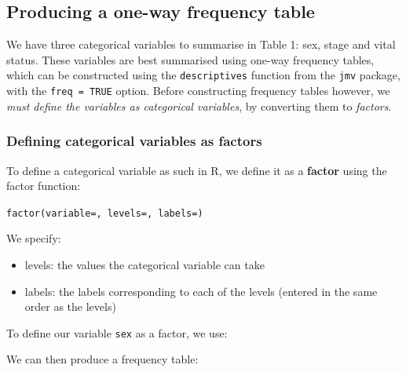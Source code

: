 \documentclass[
  a4paper,
]{memoir}
\newenvironment{Shaded}{\begin{snugshade}}{\end{snugshade}}
\newcommand{\AttributeTok}[1]{\textcolor[rgb]{0.00,0.00,0.00}{#1}}
\newcommand{\DecValTok}[1]{\textcolor[rgb]{0.00,0.00,0.00}{#1}}
\newcommand{\FunctionTok}[1]{\textcolor[rgb]{0.00,0.00,0.00}{#1}}
\newcommand{\NormalTok}[1]{\textcolor[rgb]{0.00,0.00,0.00}{#1}}
\newcommand{\OtherTok}[1]{\textcolor[rgb]{0.00,0.00,0.00}{#1}}
\newcommand{\SpecialCharTok}[1]{\textcolor[rgb]{0.00,0.00,0.00}{#1}}
\newcommand{\StringTok}[1]{\textcolor[rgb]{0.00,0.00,0.00}{#1}}
\providecommand{\tightlist}{%
  \setlength{\itemsep}{0pt}\setlength{\parskip}{0pt}}\usepackage{longtable,booktabs,array}
\begin{document}
\hypertarget{producing-a-one-way-frequency-table-1}{%
\subsection{Producing a one-way frequency
table}\label{producing-a-one-way-frequency-table-1}}

We have three categorical variables to summarise in Table 1: sex, stage
and vital status. These variables are best summarised using one-way
frequency tables, which can be constructed using the
\texttt{descriptives} function from the \texttt{jmv} package, with the
\texttt{freq\ =\ TRUE} option. Before constructing frequency tables
however, we \emph{must define the variables as categorical variables},
by converting them to \emph{factors}.

\hypertarget{sec-cat-as-factors}{%
\subsubsection{Defining categorical variables as
factors}\label{sec-cat-as-factors}}

To define a categorical variable as such in R, we define it as a
\textbf{factor} using the factor function:

\texttt{factor(variable=,\ levels=,\ labels=)}

We specify:

\begin{itemize}
\tightlist
\item
  levels: the values the categorical variable can take
\item
  labels: the labels corresponding to each of the levels (entered in the
  same order as the levels)
\end{itemize}

To define our variable \texttt{sex} as a factor, we use:

\begin{Shaded}
\end{Shaded}

We can then produce a frequency table:
\end{document}

